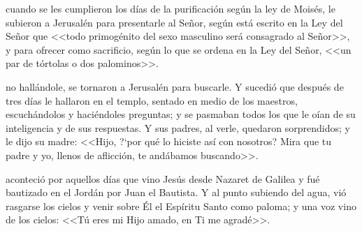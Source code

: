 \documentclass[10pt,twoside]{book}
\begin{document}
\vspace{2mm}



\vspace{5mm}

\noindent{}
\space cuando se les cumplieron los días de la purificación según la ley de Moisés, le subieron a Jerusalén para presentarle al Señor,
según está escrito en la Ley del Señor que <<todo primogénito del sexo masculino será consagrado al Señor>>, y para ofrecer como sacrificio,
según lo que se ordena en la Ley del Señor, <<un par de tórtolas o dos palominos>>.

\vspace{2mm}



\vspace{5mm}

\noindent{}
\space no hallándole, se tornaron a Jerusalén para buscarle. Y sucedió que después de tres días le hallaron en el templo,
sentado en medio de los maestros, escuchándolos y haciéndoles preguntas; y se pasmaban todos los que le oían de su inteligencia y de sus respuestas.
Y sus padres, al verle, quedaron sorprendidos; y le dijo su madre: <<Hijo, {?`}por qué lo hiciste así con nosotros? Mira que tu padre y yo, llenos de aflicción, 
te andábamos buscando>>.

\vspace{2mm}

{}

\vspace{2mm}

\iralfinal

\vspace{5mm}

\noindent{}

\vspace{4mm}

\noindent{}
\space aconteció por aquellos días que vino Jesús desde Nazaret de Galilea y fué bautizado en el Jordán por Juan el Bautista.
Y al punto subiendo del agua, vió rasgarse los cielos y venir sobre Él el Espíritu Santo como paloma; y una voz vino de los cielos: 
<<Tú eres mi Hijo amado, en Ti me agradé>>.
\end{document}
